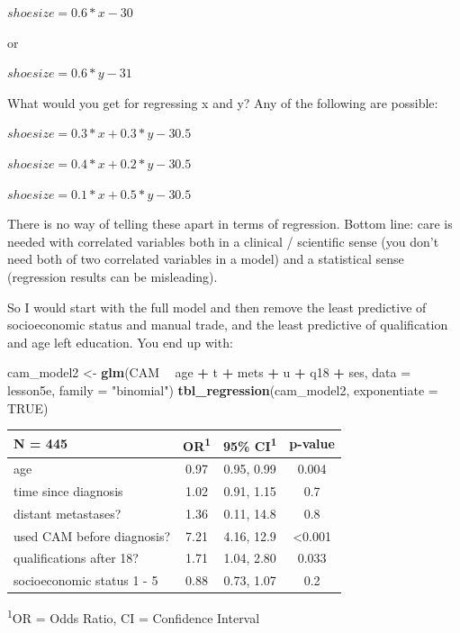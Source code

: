 \documentclass[]{book}
\newenvironment{Shaded}{\begin{snugshade}}{\end{snugshade}}
\newcommand{\DataTypeTok}[1]{\textcolor[rgb]{0.13,0.29,0.53}{#1}}
\newcommand{\KeywordTok}[1]{\textcolor[rgb]{0.13,0.29,0.53}{\textbf{#1}}}
\newcommand{\NormalTok}[1]{#1}
\newcommand{\OperatorTok}[1]{\textcolor[rgb]{0.81,0.36,0.00}{\textbf{#1}}}
\newcommand{\OtherTok}[1]{\textcolor[rgb]{0.56,0.35,0.01}{#1}}
\newcommand{\StringTok}[1]{\textcolor[rgb]{0.31,0.60,0.02}{#1}}
\begin{document}
\(shoesize = 0.6*x - 30\)

or

\(shoesize = 0.6*y - 31\)

What would you get for regressing x and y? Any of the following are possible:

\(shoesize = 0.3*x + 0.3*y - 30.5\)

\(shoesize = 0.4*x + 0.2*y - 30.5\)

\(shoesize = 0.1*x + 0.5*y - 30.5\)

There is no way of telling these apart in terms of regression. Bottom line: care is needed with correlated variables both in a clinical / scientific sense (you don't need both of two correlated variables in a model) and a statistical sense (regression results can be misleading).

So I would start with the full model and then remove the least predictive of socioeconomic status and manual trade, and the least predictive of qualification and age left education. You end up with:

\begin{Shaded}
\begin{Highlighting}[]
\NormalTok{cam_model2 <-}\StringTok{ }\KeywordTok{glm}\NormalTok{(CAM }\OperatorTok{~}\StringTok{ }\NormalTok{age }\OperatorTok{+}\StringTok{ }\NormalTok{t }\OperatorTok{+}\StringTok{ }\NormalTok{mets }\OperatorTok{+}\StringTok{ }\NormalTok{u }\OperatorTok{+}\StringTok{ }\NormalTok{q18 }\OperatorTok{+}\StringTok{ }\NormalTok{ses,}
                  \DataTypeTok{data =}\NormalTok{ lesson5e,}
                  \DataTypeTok{family =} \StringTok{"binomial"}\NormalTok{)}
\KeywordTok{tbl_regression}\NormalTok{(cam_model2, }\DataTypeTok{exponentiate =} \OtherTok{TRUE}\NormalTok{)}
\end{Highlighting}
\end{Shaded}

\captionsetup[table]{labelformat=empty,skip=1pt}
\begin{longtable}{lccc}
\toprule
\textbf{N = 445} & \textbf{OR}\textsuperscript{1} & \textbf{95\% CI}\textsuperscript{1} & \textbf{p-value} \\ 
\midrule
age & 0.97 & 0.95, 0.99 & 0.004 \\ 
time since diagnosis & 1.02 & 0.91, 1.15 & 0.7 \\ 
distant metastases? & 1.36 & 0.11, 14.8 & 0.8 \\ 
used CAM before diagnosis? & 7.21 & 4.16, 12.9 & <0.001 \\ 
qualifications after 18? & 1.71 & 1.04, 2.80 & 0.033 \\ 
socioeconomic status 1 - 5 & 0.88 & 0.73, 1.07 & 0.2 \\ 
\bottomrule
\end{longtable}
\vspace{-5mm}
\begin{minipage}{\linewidth}
\textsuperscript{1}OR = Odds Ratio, CI = Confidence Interval \\ 
\end{minipage}
\end{document}
